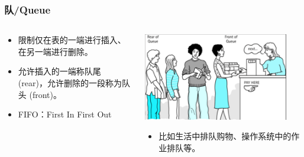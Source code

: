 \begin{frame}[fragile]
  \frametitle{队/Queue}
   \begin{columns}
    \begin{column}[T]{0.5\linewidth}
      \begin{tcolorbox}[colframe=blue!80, height=6.5cm, title=队/Queue]
        \small
        \begin{itemize}
        \item 限制仅在表的一端进行插入、在另一端进行删除。
        \item 允许插入的一端称队尾 (rear)，允许删除的一段称为队头 (front)。
        \item FIFO：First In First Out
        \end{itemize}
      \end{tcolorbox}
    \end{column}
    \begin{column}[T]{0.5\linewidth}
      \includegraphics[width=0.9\textwidth]{figs/queue/queueofpeople.png}

      \begin{itemize}
      \item 比如生活中排队购物、操作系统中的作业排队等。
      \end{itemize}
    \end{column}
  \end{columns}
\end{frame}


